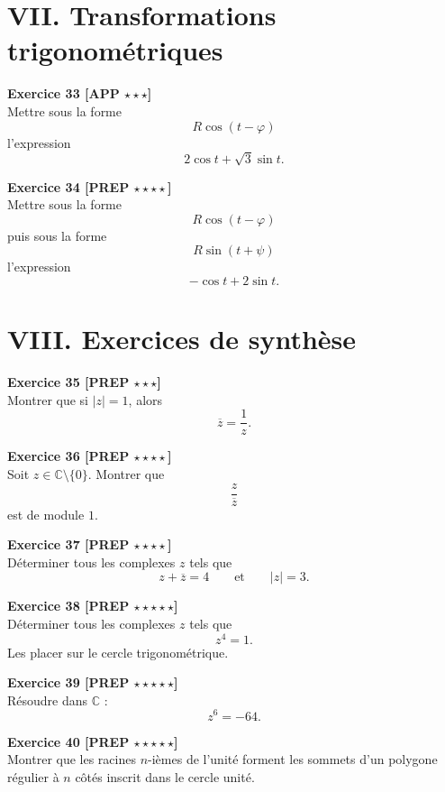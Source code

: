\documentclass[11pt,a4paper]{article}
\newcommand{\C}{\mathbb{C}}
\begin{document}
\section*{VII. Transformations trigonométriques}

\textbf{Exercice 33 [APP $\star\star\star$]}\\
Mettre sous la forme
\[
R\cos(t-\varphi)
\]
l’expression
\[
2\cos t+\sqrt{3}\sin t.
\]

\textbf{Exercice 34 [PREP $\star\star\star\star$]}\\
Mettre sous la forme
\[
R\cos(t-\varphi)
\]
puis sous la forme
\[
R\sin(t+\psi)
\]
l’expression
\[
-\cos t+2\sin t.
\]

\section*{VIII. Exercices de synthèse}

\textbf{Exercice 35 [PREP $\star\star\star$]}\\
Montrer que si \(|z|=1\), alors
\[
\overline z=\frac{1}{z}.
\]

\textbf{Exercice 36 [PREP $\star\star\star\star$]}\\
Soit \(z\in\C\setminus\{0\}\). Montrer que
\[
\frac{z}{\overline z}
\]
est de module \(1\).

\textbf{Exercice 37 [PREP $\star\star\star\star$]}\\
Déterminer tous les complexes \(z\) tels que
\[
z+\overline z=4
\qquad \text{et} \qquad
|z|=3.
\]

\textbf{Exercice 38 [PREP $\star\star\star\star\star$]}\\
Déterminer tous les complexes \(z\) tels que
\[
z^4=1.
\]
Les placer sur le cercle trigonométrique.

\textbf{Exercice 39 [PREP $\star\star\star\star\star$]}\\
Résoudre dans \(\C\) :
\[
z^6=-64.
\]

\textbf{Exercice 40 [PREP $\star\star\star\star\star$]}\\
Montrer que les racines \(n\)-ièmes de l’unité forment les sommets d’un polygone régulier à \(n\) côtés inscrit dans le cercle unité.
\end{document}

